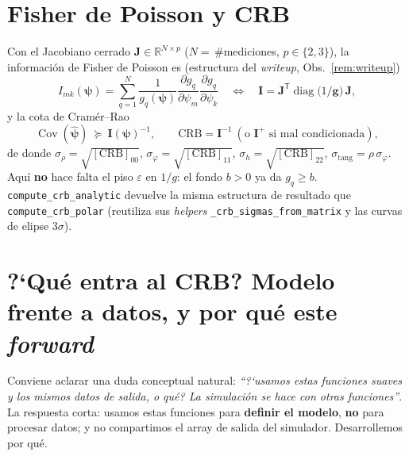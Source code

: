 \documentclass[11pt,a4paper]{article}
\theoremstyle{plain}
\theoremstyle{definition}
\newcommand{\vect}[1]{\boldsymbol{#1}}
\newcommand{\matr}[1]{\mathbf{#1}}
\newcommand{\R}{\mathbb{R}}
\DeclareMathOperator{\diag}{diag}
\DeclareMathOperator{\Cov}{Cov}
\begin{document}
\section{Fisher de Poisson y CRB}
\label{sec:fisher}

Con el Jacobiano cerrado $\matr{J}\in\R^{N\times p}$
($N=$\,\#mediciones, $p\in\{2,3\}$), la informaci\'on de Fisher de Poisson es
(estructura del \emph{writeup}, Obs.~\ref{rem:writeup})
\begin{equation}
    I_{mk}(\vect{\psi})
    =\sum_{q=1}^{N}\frac{1}{g_q(\vect{\psi})}
    \frac{\partial g_q}{\partial\psi_m}\frac{\partial g_q}{\partial\psi_k}
    \quad\Longleftrightarrow\quad
    \matr{I}=\matr{J}^{\mathsf T}\diag\!\bigl(1/\vect{g}\bigr)\,\matr{J},
    \label{eq:fisher}
\end{equation}
y la cota de Cram\'er--Rao
\begin{equation}
    \Cov(\hat{\vect{\psi}})\ \succeq\ \matr{I}(\vect{\psi})^{-1},
    \qquad
    \mathrm{CRB}=\matr{I}^{-1}\ (\text{o }\matr{I}^{+}\text{ si mal condicionada}),
    \label{eq:crb}
\end{equation}
de donde $\sigma_\rho=\sqrt{[\mathrm{CRB}]_{00}}$,
$\sigma_\varphi=\sqrt{[\mathrm{CRB}]_{11}}$,
$\sigma_h=\sqrt{[\mathrm{CRB}]_{22}}$, $\sigma_{\mathrm{tang}}=\rho\,\sigma_\varphi$.
Aqu\'i \textbf{no} hace falta el piso $\varepsilon$ en $1/g$: el fondo $b>0$ ya da
$g_q\ge b$. \texttt{compute\_crb\_analytic} devuelve la misma estructura de
resultado que \texttt{compute\_crb\_polar} (reutiliza sus \emph{helpers}
\texttt{\_crb\_sigmas\_from\_matrix} y las curvas de elipse $3\sigma$).

\section{\textup{?`}Qu\'e entra al CRB? Modelo frente a datos, y por qu\'e este \emph{forward}}
\label{sec:que-entra}

Conviene aclarar una duda conceptual natural: \emph{``\textup{?`}usamos estas
funciones suaves y los mismos datos de salida, o qu\'e? La simulaci\'on se hace
con otras funciones''}. La respuesta corta: usamos estas funciones para
\textbf{definir el modelo}, \textbf{no} para procesar datos; y no compartimos el
array de salida del simulador. Desarrollemos por qu\'e.
\end{document}

